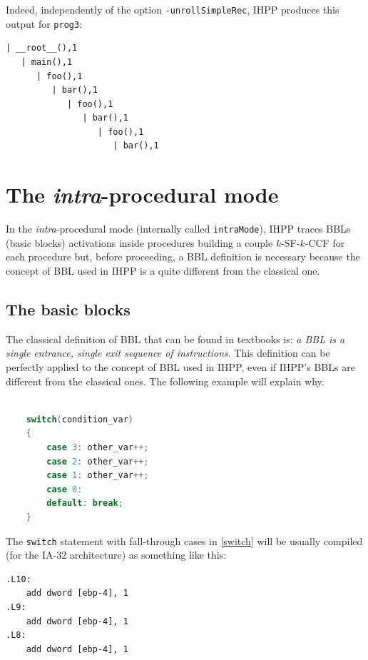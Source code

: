 \documentclass[a4paper,10pt]{report}
\begin{document}
\noindent
Indeed, independently of the option \verb|-unrollSimpleRec|, 
IHPP produces this output for \verb|prog3|:
\begin{lstlisting}[label=out7, caption={IHPP partial output for \texttt{prog3}},frame=bottomline]
| __root__(),1
   | main(),1
      | foo(),1
         | bar(),1
            | foo(),1
               | bar(),1
                  | foo(),1
                     | bar(),1

\end{lstlisting}


\section{The \emph{intra}-procedural mode}

In the \emph{intra}-procedural mode (internally called \verb|intraMode|), 
IHPP traces BBLs (basic blocks) activations inside procedures building a couple $k$-SF-$k$-CCF for each procedure but, before proceeding, a BBL definition is necessary 
because the concept of BBL used in IHPP is a quite different from the classical one.

\subsection{The basic blocks}
The classical definition of BBL that can be found in textbooks is: \emph{a BBL is a single entrance, single exit sequence of instructions}. 
This definition can be perfectly applied to the concept of BBL used in IHPP, 
even if IHPP's BBLs are different from the classical ones. 
The following example will explain why.

\begin{lstlisting}[language=C, 
	caption={a switch statement}, label=switch, frame=leftline]

    switch(condition_var)
    {
        case 3: other_var++;
        case 2: other_var++;
        case 1: other_var++;
        case 0:
        default: break;
    }

\end{lstlisting}

\noindent
The \verb|switch| statement with fall-through cases in \cref{switch} 
will be usually compiled (for the IA-32 architecture) as something like this:

\begin{lstlisting}[language={[x86masm]Assembler}, 
	frame=leftline, label=asm1, caption={assembly code relative to \cref{switch}}]
.L10:
	add dword [ebp-4], 1
.L9:
	add dword [ebp-4], 1
.L8:
	add dword [ebp-4], 1
\end{lstlisting}
\end{document}
